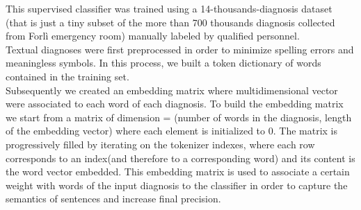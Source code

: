 This supervised classifier was trained using a 14-thousands-diagnosis dataset (that is just a tiny subset of the more than 700 thousands diagnosis collected from Forlì emergency room) manually labeled by qualified personnel.\\
Textual diagnoses were first preprocessed in order to minimize spelling errors and meaningless symbols. In this process, we built a token dictionary of words contained in the training set.\\
Subsequently we created an embedding matrix where multidimensional vector were associated to each word of each diagnosis.
To build the embedding matrix we start from a matrix of dimension = (number of words in the diagnosis, length of the embedding vector) where each element is initialized to 0. The matrix is progressively filled by iterating on the tokenizer indexes, where each row corresponds to an index(and therefore to a corresponding word) and its content is the word vector embedded.
This embedding matrix is used to associate a certain weight with words of the input diagnosis to the classifier in order to capture the semantics of sentences and increase final precision.




